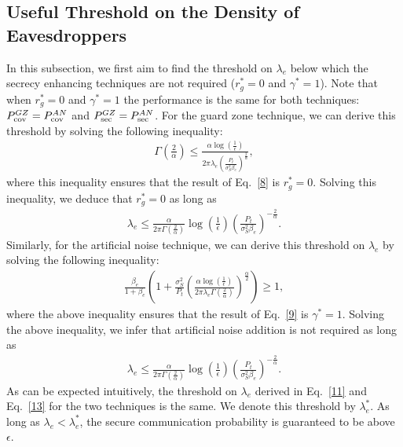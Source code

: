 \documentclass[final]{IEEEtran}
\begin{document}
\subsection{Useful Threshold on the Density of Eavesdroppers}
In this subsection, we first aim to find the threshold on $\lambda_e$ below which the secrecy enhancing techniques are not required ($r_g^{*}=0$ and $\gamma^{*}=1$). Note that when $r_g^{*}=0$ and $\gamma^{*}=1$ the performance is the same for both techniques: $P_{\rm cov}^{GZ}=P_{\rm cov}^{AN}$ and $P_{\rm sec}^{GZ}=P_{\rm sec}^{AN}$. For the guard zone technique, we can derive this threshold by solving the following inequality:
\begin{align}
\label{10}
\Gamma\left(\frac{2}{\alpha}\right)\leq\frac{\alpha\log\left(\frac{1}{\epsilon}\right)}{2\pi\lambda_{e}\left(\frac{P_{t}}{\sigma_S^2\beta_e}\right)^{\frac{2}{\alpha}}},
\end{align}
where this inequality ensures that the result of Eq.~\ref{8} is $r_g^{*}=0$. Solving this inequality, we deduce that $r_g^{*}=0$ as long as
\begin{align}
\label{11}
\lambda_e\leq \frac{\alpha}{2\pi \Gamma\left(\frac{2}{\alpha}\right)} \log\left(\frac{1}{\epsilon}\right)
\left(\frac{P_{t}}{\sigma_S^2\beta_e}\right)^{-\frac{2}{\alpha}}.
\end{align} 
Similarly, for the artificial noise technique, we can derive this threshold  on $\lambda_e$ by solving the following inequality:
\begin{align}
\label{12}
\frac{\beta_e}{1+\beta_e}\left(1+\frac{\sigma_S^2}{P_t}\left(\frac{\alpha \log\left(\frac{1}{\epsilon}\right)}{2\pi\lambda_e\Gamma(\frac{2}{\alpha})}\right)^{\frac{\alpha}{2}}\right) \geq 1,
\end{align}
where the above inequality ensures that the result of Eq.~\ref{9} is $\gamma^{*}=1$. Solving the above inequality, we infer that artificial noise addition is not required as long as
\begin{align}
\label{13}
\lambda_e\leq \frac{\alpha}{2\pi \Gamma\left(\frac{2}{\alpha}\right)} \log\left(\frac{1}{\epsilon}\right)
\left(\frac{P_{t}}{\sigma_S^2\beta_e}\right)^{-\frac{2}{\alpha}}.
\end{align}
As can be expected intuitively, the threshold on $\lambda_e$ derived in Eq.~\ref{11} and Eq.~\ref{13} for the two techniques is the same. We denote this threshold by $\lambda_e^{*}$.  
As long as $\lambda_e < \lambda_e^{*}$, the secure communication probability is guaranteed to be above $\epsilon$. 
\vspace{-5mm}	
\end{document}
